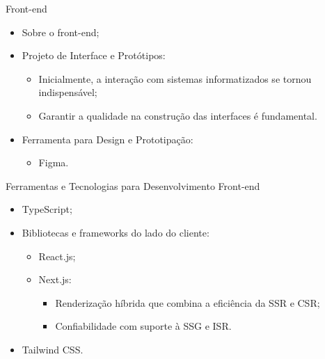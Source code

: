 \begin{frame}{Front-end}
    \begin{itemize}
        \item Sobre o front-end; \vspace{0.5cm}
        \item Projeto de Interface e Protótipos: \vspace{0.5cm}
              \begin{itemize}
                  \item Inicialmente, a interação com sistemas informatizados se tornou indispensável; \vspace{0.25cm}
                  \item Garantir a qualidade na construção das interfaces é fundamental. \vspace{0.25cm}
              \end{itemize}
        \item Ferramenta para Design e Prototipação: \vspace{0.5cm}
              \begin{itemize}
                  \item Figma. \vspace{0.25cm}
              \end{itemize}
    \end{itemize}
\end{frame}

\begin{frame}{Ferramentas e Tecnologias para Desenvolvimento Front-end}
    \begin{itemize}
        \item TypeScript; \vspace{0.5cm}
        \item Bibliotecas e frameworks do lado do cliente: \vspace{0.5cm}
        \begin{itemize}
            \item React.js; \vspace{0.25cm}
            \item Next.js: \vspace{0.25cm}
                \begin{itemize}
                    \item Renderização híbrida que combina a eficiência da SSR e CSR; \vspace{0.25cm}
                    \item Confiabilidade com suporte à SSG e ISR. \vspace{0.25cm}
                \end{itemize}
        \end{itemize}
        \item Tailwind CSS. \vspace{0.5cm}
    \end{itemize}
\end{frame}

